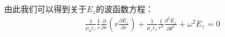\begin{appendices}
  由此我们可以得到关于$E_z$的波函数方程：
  \begin{eqnarray}
    \frac{1}{\mu_\theta\epsilon_z}\frac{1}{r}\frac{\partial}{\partial r}
    \left(r\frac{\partial E_z}{\partial r}\right)+
    \frac{1}{\mu_r\epsilon_z}\frac{1}{r^2}\frac{\partial^2E_z}{\partial\theta^2}
    +\omega^2 E_z=0
  \end{eqnarray}
\end{appendices}
